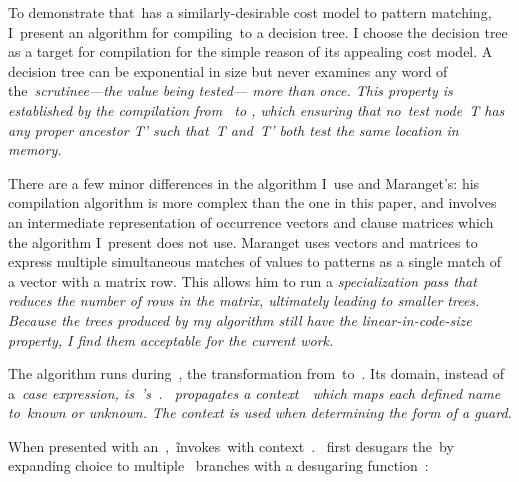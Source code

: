 \documentclass[manuscript,screen, 12pt, nonacm]{acmart}
\begin{document}
    To demonstrate that~\VMinus has a similarly-desirable cost model to pattern
    matching, I~present an algorithm for compiling~\VMinus to a decision tree. I
    choose the decision tree as a target for compilation for the simple reason
    of its appealing cost model. A decision tree can be exponential in size but
    never examines any word of the~\it{scrutinee}---the value being tested---%
    more than once. This property is established by the compilation from~\VMinus
    to \D, which ensuring that no~\it{test} node~\it{T} has any proper ancestor
    \it{T'} such that~\it{T} and~\it{T'} both test the same location in memory.   

    There are a few minor differences in the algorithm I~use and Maranget's: his
    compilation algorithm is more complex than the one in this paper, and
    involves an intermediate representation of occurrence vectors and clause
    matrices which the algorithm I~present does not use. Maranget uses vectors
    and matrices to express multiple simultaneous matches of values to patterns
    as a single match of a vector with a matrix row. This allows him to run a
    \it{specialization} pass that reduces the number of rows in the matrix,
    ultimately leading to smaller trees. Because the trees produced by my
    algorithm still have the linear-in-code-size property, I find them
    acceptable for the current work. 

    The algorithm runs during~\DTran, the transformation from~\VMinus to~\D. Its
    domain, instead of a~\it{case} expression, is~\VMinus's~\iffibf.
    \DTran~propagates a context~\ctx\ which maps each defined name to~\it{known} or
    \it{unknown}. The context is used when determining the form of a guard.
       




    When presented with an~\iffibf,~\DTran\~invokes~\Compile with context~\ctx.
    \Compile~first desugars the~\iffibf by expanding choice to multiple~\iffibf
    branches with a desugaring function~\ITran: 
    
    
\end{document}
